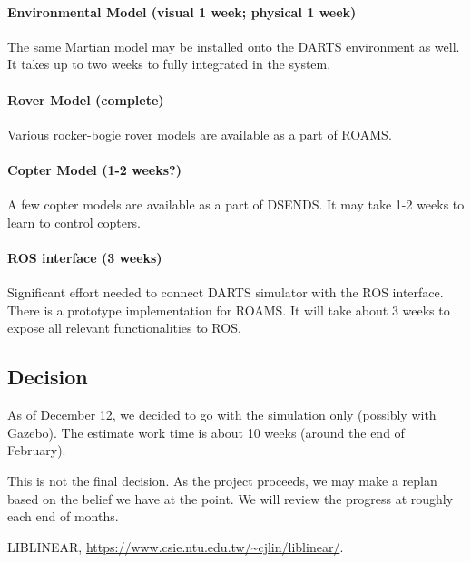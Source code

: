 \documentclass[conference]{IEEEtran}
\begin{document}
\paragraph{Environmental Model (visual 1 week; physical 1 week)}
The same Martian model may be installed onto the DARTS environment as well. It takes up to two weeks to fully integrated in the system.

\paragraph{Rover Model (complete)}
Various rocker-bogie rover models are available as a part of ROAMS.

\paragraph{Copter Model (1-2 weeks?)}
A few copter models are available as a part of DSENDS. It may take 1-2 weeks to learn to control copters.

\paragraph{ROS interface (3 weeks)}
Significant effort needed to connect DARTS simulator with the ROS interface. There is a prototype implementation for ROAMS. It will take about 3 weeks to expose all relevant functionalities to ROS.


\subsection{Decision}
As of December 12, we decided to go with the simulation only (possibly with Gazebo). The estimate work time is about 10 weeks (around the end of February). 

This is not the final decision. As the project proceeds, we may make a replan based on the belief we have at the point. We will review the progress at roughly each end of months. 


\begin{thebibliography}{99}
LIBLINEAR, \url{https://www.csie.ntu.edu.tw/~cjlin/liblinear/}.

\end{thebibliography}
\end{document}
